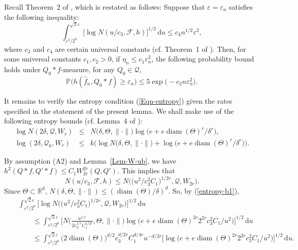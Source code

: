 \documentclass[MSNbibl,number,citesort]{arxbj}
\newcommand{\eqref}[1]{(\ref{#1})}
\newcommand{\real}{\mathbb{R}}
\newcommand{\Fcal}{\mathcal{F}}
\newcommand{\Qcal}{\mathcal{Q}}
\newcommand{\Prob}{\mathbb{P}}
\newcommand{\Diam}{\operatorname{diam}}
\newcommand{\hatf}{\hat{f}}
\begin{document}
\begin{pf}
Recall Theorem~2 of \cite{Wong-Shen-95},
which is restated as follows:
Suppose that $\varepsilon= \varepsilon_n$ satisfies the following inequality:
%
%
\begin{equation}
\label{Eqn-entropy} \int_{\varepsilon^2/2^8}^{\sqrt{2}\varepsilon} \bigl[\log
N(u/c_3, \Fcal, h) \bigr]^{1/2} \,\mathrm{d}u \leq c_4
n^{1/2}\varepsilon^2,
\end{equation}
%
where $c_3$ and $c_4$ are certain universal constants (cf. Theorem~1 of
\cite{Wong-Shen-95}). Then, for some universal constants $c_1, c_2 > 0$,
if $\eta_n \leq c_1 \varepsilon_n^2$, the following probability bound
holds under $Q_0*f$-measure, for any $Q_0 \in\Qcal$,
%
\[
\Prob \bigl( h(\hatf_n, Q_0*f) \geq\varepsilon_n
\bigr) \leq5\exp \bigl(-c_2 n\varepsilon_n^2
\bigr).
\]

It remains to verify the entropy condition \eqref{Eqn-entropy} given
the rates specified in the statement of the present lemma. We
shall make use of the following entropy bounds (cf. Lemma~4 of \cite
{Nguyen-11}):
%
%
\begin{eqnarray}
\label{entropy-b1} \log N(2\delta, \Qcal, W_{r}) & \leq& N\bigl(\delta,
\Theta, \|\cdot\|\bigr) \log \bigl(e+e\Diam(\Theta)^{r}/
\delta^{r} \bigr),
\\
\label{entropy-b2} \log(2\delta, \Qcal_k, W_{r}) & \leq& k
\bigl(\log N\bigl(\delta, \Theta, \| \cdot\|\bigr) + \log \bigl(e + e\operatorname{diam}(
\Theta)^{r}/\delta^{r} \bigr) \bigr).
\end{eqnarray}

%
By assumption (A2) and Lemma~\ref{Lem-W-ub},
we have $h^2(Q*f, Q'*f) \leq C_1W_{2r}^{2r}(Q,Q')$.
%
This implies that
%
\[
N(u/c_3,\Fcal, h) \leq N \bigl( \bigl(u^2/c_3^2
C_1 \bigr)^{1/2r}, \Qcal, W_{2r} \bigr).
\]
%
Since $\Theta\subset\real^d$, $N(\delta, \Theta, \|\cdot\|) \leq
(\operatorname{diam}(\Theta)/\delta)^d$. So, by \eqref{entropy-b1},
%
\begin{eqnarray*}
&&\int_{\varepsilon^2/2^8}^{\sqrt{2}\varepsilon} \bigl[\log N \bigl(
\bigl(u^2/c_3^2C_1
\bigr)^{1/2r}, \Qcal, W_{2r} \bigr) \bigr]^{1/2} \,\mathrm{d}u
\\
&&\qquad\leq\int_{\varepsilon^2/2^8}^{\sqrt{2}\varepsilon} \biggl[N \biggl(
\frac{u^{1/r}}{2c_3^{1/r}C_1^{1/2r}}, \Theta, \|\cdot\| \biggr) \log \bigl(e+e\Diam(
\Theta)^{2r}2^{2r}c_3^2C_1/u^2
\bigr) \biggr]^{1/2}\,\mathrm{d}u
\\
&&\qquad\leq\int_{\varepsilon^2/2^8}^{\sqrt{2}\varepsilon} \bigl(2\operatorname{diam}(
\Theta) \bigr)^{d/2}c_3^{d/2r}C_1^{d/4r}u^{-d/2r}
\bigl[\log \bigl(e+e\Diam(\Theta)^{2r}2^{2r}c_3^2C_1/u^2
\bigr) \bigr]^{1/2}\,\mathrm{d}u.
\end{eqnarray*}


\end{pf}
\end{document}
